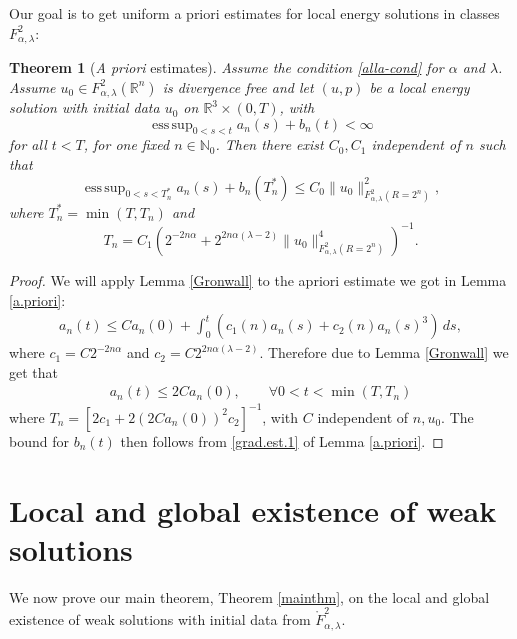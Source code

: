 \documentclass[11pt]{article}
\numberwithin{equation}{section}
\newtheorem{thm}{Theorem}[section]
\theoremstyle{remark}
\theoremstyle{definition}
\newcommand{\bke}[1]{\left ( #1 \right )}
\newcommand{\R}{\mathbb{R}}
\newcommand\al{\alpha}
\newcommand\la{\lambda}
\newcommand{\NN}{\mathbb{N}}
\newcommand{\esssup} {\mathop{\mathrm{ess\,sup}}}
\newcommand{\EQ}[1]{\begin{equation} #1 \end{equation}}
\newcommand{\EQN}[1]{\begin{equation*}\begin{split} #1 \end{split}\end{equation*}}
\begin{document}
Our goal is to get uniform a priori estimates for local energy solutions in classes $F^2_{\al,\la}$:
\begin{thm}[\textit{A priori} estimates]\label{uniform.bound}
Assume the condition \eqref{alla-cond} for $\al$ and $\la$.
  Assume $u_0\in F^2_{\al,\la}(\R^n)$ is divergence free and let $(u,p)$ be a local energy solution with initial data $u_0$ on $\R^3\times(0,T)$, with
  \EQ{\label{eq4.6}
  \esssup_{0<s<t}a_n(s)+b_n(t)< \infty
  }
  for all $t<T$, for one fixed $n\in \NN_0$. Then there exist $C_0,C_1$ independent of $n$ such that
 \EQ{\label{eq3.6}
  \esssup_{0<s<T_n^*}a_n(s)+b_n(T_n^*)\le C_0\|u_0\|_{F^2_{\al,\la}(R=2^n)}^2,
  }
where $T_n^* = \min(T, T_n)$ and
\EQ{\label{Tn.def}
T_n=C_1\bke{ 2^{-2n\al} + 2^{2n\al(\la-2)} \|u_0\|_{F^2_{\al,\la}(R=2^n)}^4}^{-1}.
}
\end{thm}
\begin{proof}
  We will apply Lemma \ref{Gronwall} to the apriori estimate we got in Lemma \ref{a.priori}:
  \EQN{
  a_n(t)\le C a_n(0)+\int_{0}^{t}(c_1(n)a_n(s)+c_2(n)a_n(s)^3)\,ds,
 }
where $c_1= C 2^{-2n\al}$ and $c_2=C 2^{2n\al(\la-2)}$.
  Therefore due to Lemma \ref{Gronwall} we get that
  \EQN{
   a_n(t)\le 2Ca_n(0),\qquad \forall 0<t<\min(T,T_n)
  }
 where $T_n=[2c_1+2(2Ca_n(0))^2c_2]^{-1}$,
 with $C$ independent of $n,u_0$.
The bound for $b_n(t)$ then follows from \eqref{grad.est.1} of Lemma \ref{a.priori}.
\end{proof}

\section{Local and global existence of weak solutions}
\label{sec5}
We now prove our main theorem,  Theorem \ref{mainthm}, on the local and global existence of weak solutions with initial data from $\mathring F^2_{\al,\la}$.
\end{document}
